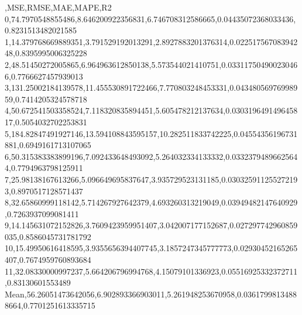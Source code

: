 ,MSE,RMSE,MAE,MAPE,R2
0,74.7970548855486,8.646200922356831,6.746708312586665,0.04435072368033436,0.8231513482021585
1,14.379768669889351,3.791529192013291,2.8927883201376314,0.02251756708394248,0.8395995006325228
2,48.51450272005865,6.964963612850138,5.573544021410751,0.033117504900230466,0.7766627457939013
3,131.25002184139578,11.455530891722466,7.770803248453331,0.04348056976998959,0.7414205324578718
4,50.672541503358524,7.118320835894451,5.605478212137634,0.030319649149645817,0.5054032702253831
5,184.82847491927146,13.594108843595157,10.282511833742225,0.04554356196731881,0.6949161713107065
6,50.315383383899196,7.092433648493092,5.264032334133332,0.03323794896625644,0.7794963798125911
7,25.98138167613266,5.096649695837647,3.935729523131185,0.030325911255272193,0.8970517128571437
8,32.65860999118142,5.714267927642379,4.693260313219049,0.03949482147640929,0.7263937099081411
9,14.145631072152826,3.7609423959951407,3.042007177152687,0.027297742960859035,0.8586045731781792
10,15.49950616418595,3.9355656394407745,3.1857247345777773,0.02930452165265407,0.7674959760893684
11,32.08330000997237,5.664206796994768,4.15079101336923,0.05516925332372711,0.83130601553489
Mean,56.26051473642056,6.902893366903011,5.261948253670958,0.03617998134888664,0.7701251613335715
